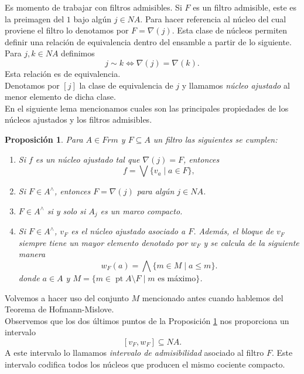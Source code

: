 \documentclass[11pt]{amsart}
\DeclareMathOperator{\pt}{pt}
\theoremstyle{plain}
\newtheorem{prop}[thm]{Proposición}
\theoremstyle{definition}
\begin{document}
Es momento de trabajar con filtros admisibles. Si $F$ es un filtro admisible, este es la preimagen del $1$ bajo algún $j\in NA$. Para hacer referencia al núcleo del cual proviene el 
filtro lo denotamos por $F=\nabla(j)$. Esta clase de núcleos permiten definir una relación de equivalencia dentro del ensamble a partir de lo siguiente. 
Para $j, k\in NA$ definimos
\[
j\sim k\iff  \nabla(j)=\nabla(k).
\]
Esta relación es de equivalencia.\\

Denotamos por $[j]$ la clase de equivalencia de $j$ y llamamos \emph{núcleo ajustado} al menor elemento de dicha clase.\\

En el siguiente lema mencionamos cuales son las principales propiedades de los núcleos ajustados y los filtros admisibles.

\begin{prop}\label{Fadmisiblesynucleosaju}
Para $A\in Frm$ y $F\subseteq A$ un filtro las siguientes se cumplen:
\begin{enumerate}
\item Si $f$ es un núcleo ajustado tal que $\nabla(j)=F$, entonces 
\[
f=\bigvee\{v_a\mid a\in F\},
\]
\item Si $F\in A^\wedge$, entonces $F=\nabla(j)$ para algún $j\in NA$.
\item $F\in A^\wedge$ si y solo si $A_j$ es un marco compacto.
\item Si $F\in A^\wedge$, $v_F$ es el núcleo ajustado asociado a $F$. Además, el bloque de $v_F$ siempre tiene un mayor elemento denotado por $w_F$ y se calcula de la siguiente manera 
\begin{equation}\label{wF}
w_F(a)=\bigwedge\{m\in M\mid a\leq m\}.
\end{equation}
donde $a\in A$ y $M=\{m\in \pt A\setminus F\mid m \text{ es máximo}\}$.
\end{enumerate}
\end{prop}

Volvemos a hacer uso del conjunto $M$ mencionado antes cuando hablemos del Teorema de Hofmann-Mislove.\\

Observemos que los dos últimos puntos de la Proposición \ref{Fadmisiblesynucleosaju} nos proporciona un intervalo 
\begin{equation}\label{Intervalo}
    [v_F, w_F]\subseteq NA.
\end{equation}    
A este intervalo lo llamamos \emph{intervalo de admisibilidad} asociado al filtro $F$. Este intervalo codifica todos los núcleos que producen el mismo cociente compacto.\\
\end{document}
